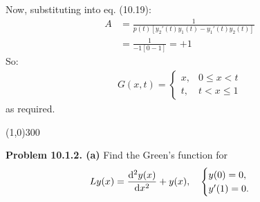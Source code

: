 \documentclass{article}
\begin{document}
Now, substituting into eq. (10.19):
\begin{equation*}
\begin{aligned}
	A &= \frac{1}{p(t)\left[y_2'(t)y_1(t) - y_1'(t)y_2(t)\right]} \\
		&= \frac{1}{-1[0-1]} = +1
\end{aligned}
\end{equation*}
So:
\begin{equation*}
\begin{aligned}
	G(x,t) =
	\begin{cases}
		x, & 0\leq x<t \\
		t, & t<x\leq 1
	\end{cases}
\end{aligned}
\end{equation*}
as required.

\begin{center}
\line(1,0){300}
\end{center}
\textbf{Problem 10.1.2. (a)} Find the Green's function for
\begin{equation*}
\begin{aligned}
	Ly(x) &= \dv[2]{y(x)}{x} + y(x),\quad
	\begin{cases}
	y(0) = 0, \\
	y'(1) = 0.
	\end{cases}
\end{aligned}
\end{equation*}
\end{document}
